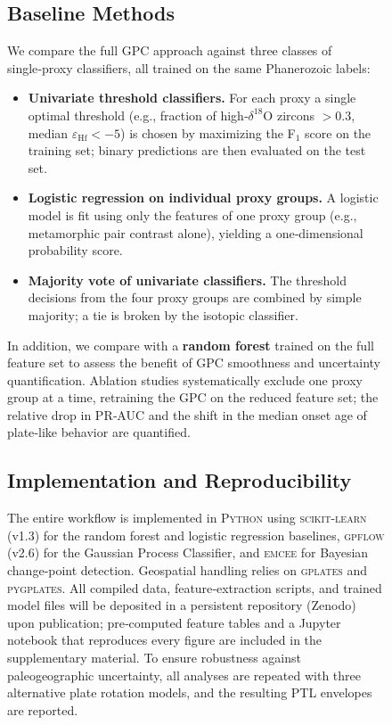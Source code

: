 \documentclass{article}
\begin{document}
\begin{figure}[t]
{\subsection{Baseline Methods}
We compare the full GPC approach against three classes of single‑proxy classifiers, all trained on the same Phanerozoic labels:
\begin{itemize}
    \item \textbf{Univariate threshold classifiers.}  
    For each proxy a single optimal threshold (e.g., fraction of high‑\(\delta^{18}\text{O}\) zircons \(>0.3\), median \(\varepsilon_{\text{Hf}} < -5\)) is chosen by maximizing the F$_1$ score on the training set; binary predictions are then evaluated on the test set.
    \item \textbf{Logistic regression on individual proxy groups.}  
    A logistic model is fit using only the features of one proxy group (e.g., metamorphic pair contrast alone), yielding a one‑dimensional probability score.
    \item \textbf{Majority vote of univariate classifiers.}  
    The threshold decisions from the four proxy groups are combined by simple majority; a tie is broken by the isotopic classifier.
\end{itemize}
In addition, we compare with a \textbf{random forest} trained on the full feature set to assess the benefit of GPC smoothness and uncertainty quantification.
Ablation studies systematically exclude one proxy group at a time, retraining the GPC on the reduced feature set; the relative drop in PR‑AUC and the shift in the median onset age of plate‑like behavior are quantified.

\subsection{Implementation and Reproducibility}
The entire workflow is implemented in \textsc{Python} using \textsc{scikit-learn} (v1.3) for the random forest and logistic regression baselines, \textsc{gpflow} (v2.6) for the Gaussian Process Classifier, and \textsc{emcee} for Bayesian change‑point detection.
Geospatial handling relies on \textsc{gplates} and \textsc{pygplates}.
All compiled data, feature‑extraction scripts, and trained model files will be deposited in a persistent repository (Zenodo) upon publication; pre‑computed feature tables and a Jupyter notebook that reproduces every figure are included in the supplementary material.
To ensure robustness against paleogeographic uncertainty, all analyses are repeated with three alternative plate rotation models, and the resulting PTL envelopes are reported.

}
\end{figure}
\end{document}
